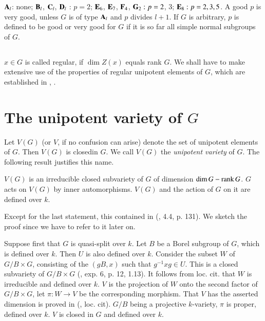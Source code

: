 $\mathbf{A}_{l}$: none; $\mathbf{B}_{l}$, $\mathbf{C}_{l}$, $\mathbf{D}_{l}$ : $p=2$; $\mathbf{E}_{6}$, $\mathbf{E}_{7}$, $\mathbf{F}_{4}$, $\mathbf{G}_{2} : p = 2$, $3$; $\mathbf{E}_{8} : p=2,3,5$. A good $p$ is very good, unless $G$ is of type $\mathbf{A}_{l}$ and $p$ divides $l+1$. If $G$ is arbitrary, $p$ is defined to be good or very good for $G$ if it is so far all simple normal subgroups of $G$.

\subsection{}\label{art19-sec0.4}
$x\in G$ is called regular, if $\dim Z(x)$ equals rank $G$. We shall have to make extensive use of the properties of regular unipotent elements of $G$, which are established in \cite{art19-key14}, \cite{art19-key15}.

\section{The unipotent variety of $G$}\label{art19-sec1}

Let $V(G)$ (or $V$, if no confusion can arise) denote the set of unipotent elements of $G$. Then $V(G)$ is closed\pageoriginale in $G$. We call $V(G)$ the {\em unipotent variety} of $G$. The following result justifies this name.

\begin{proposition}\label{art19-prop1.1}
$V(G)$ is an irreducible closed subvariety of $G$ of dimension $\dim G - \operatorname{\mathrm{rank}} G$. $G$ acts on $V(G)$ by inner automorphisms. $V(G)$ and the action of $G$ on it are defined over $k$.
\end{proposition}

Except for the last statement, this contained in (\cite{art19-key14}, 4.4, p. 131). We sketch the proof since we have to refer to it later on.

Suppose first that $G$ is quasi-split over $k$. Let $B$ be a Borel subgroup of $G$, which is defined over $k$. Then $U$ is also defined over $k$. Consider the subset $W$ of $G/B\times G$, consisting of the $(gB,x)$ such that $g^{-1}xg\in U$. This is a closed subvariety of $G/B\times G$ (\cite{art19-key5}, exp. 6, p. 12, 1.13). It follows from loc. cit. that $W$ is irreducible and defined over $k$. $V$ is the projection of $W$ onto the second factor of $G/B\times G$, let $\pi :W\to V$ be the corresponding morphism. That $V$ has the asserted dimension is proved in (\cite{art19-key14}, loc. cit). $G/B$ being a projective $k$-variety, $\pi$ is proper, defined over $k$. $V$ is closed in $G$ and defined over $k$.

